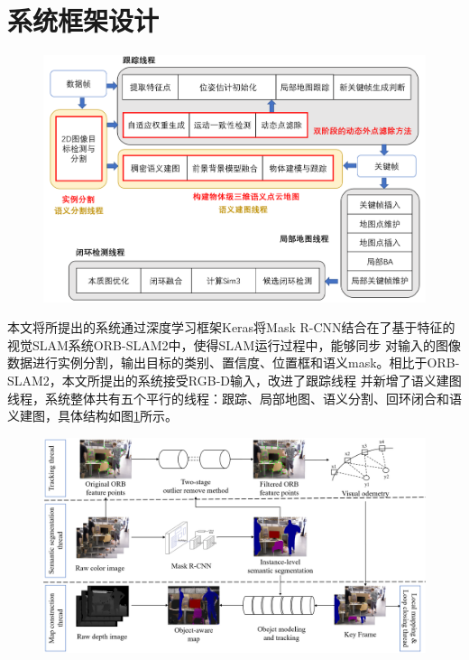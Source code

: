 \section{系统框架设计}
\begin{figure}[!htbp]
    \centering
    \includegraphics[width=\textwidth]{Img/2-orbPlus.png}
    \label{fig:orbPlus}
\end{figure}
本文将所提出的系统通过深度学习框架Keras将Mask R-CNN结合在了基于特征的视觉SLAM系统ORB-SLAM2中，使得SLAM运行过程中，能够同步
对输入的图像数据进行实例分割，输出目标的类别、置信度、位置框和语义mask。相比于ORB-SLAM2，本文所提出的系统接受RGB-D输入，改进了跟踪线程
并新增了语义建图线程，系统整体共有五个平行的线程：跟踪、局部地图、语义分割、回环闭合和语义建图，具体结构如图\ref{fig:orbPlus}所示。
\begin{figure}[!htbp]
    \centering
    \includegraphics[width=\textwidth]{Img/2-overview.jpg}
    \label{fig:overview}
\end{figure}
